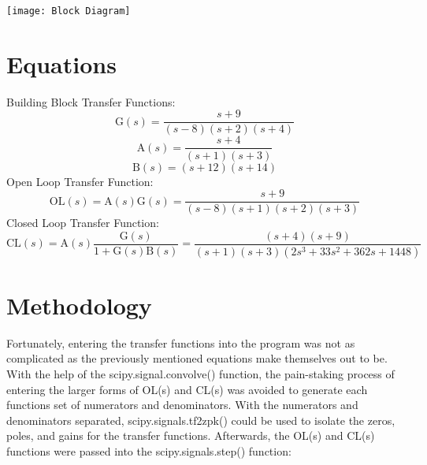 \documentclass[12pt]{report}
\begin{document}
\begin{center}
    \texttt{[image: Block Diagram]}\\
\end{center}

\section{Equations}
Building Block Transfer Functions:
\begin{equation}
    \text{G}(s) = \frac{s + 9}{(s - 8)(s + 2)(s + 4)}
\end{equation}
\begin{equation}
    \text{A}(s) = \frac{s + 4}{(s + 1)(s + 3)}
\end{equation}
\begin{equation}
    \text{B}(s) = (s + 12)(s + 14)
\end{equation}
Open Loop Transfer Function:
\begin{equation}
    \text{OL}(s) = \text{A}(s) \text{G}(s) = \frac{s + 9}{(s - 8)(s + 1)(s + 2)(s + 3)}
\end{equation}
Closed Loop Transfer Function:
\begin{equation}
    \text{CL}(s) = \text{A}(s)\frac{\text{G}(s)}{1+\text{G}(s)\text{B}(s)} = \frac{(s+4)(s+9)}{(s + 1)(s + 3)(2s^{3}+33s^{2}+362s+1448)}
\end{equation}

\pagebreak

\section{Methodology}
Fortunately, entering the transfer functions into the program was not as complicated as the previously mentioned equations make themselves out to be. With the help of the scipy.signal.convolve() function, the pain-staking process of entering the larger forms of OL(s) and CL(s) was avoided to generate each functions set of numerators and denominators. With the numerators and denominators separated, scipy.signals.tf2zpk() could be used to isolate the zeros, poles, and gains for the transfer functions. Afterwards, the OL(s) and CL(s) functions were passed into the scipy.signals.step() function:
\end{document}
